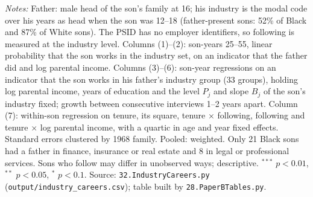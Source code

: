 \begin{table}[!htbp]
\begin{minipage}{\textwidth}\footnotesize \textit{Notes:} Father: male head of the son's family at 16; his industry is the modal code over his years as head when the son was 12--18 (father-present sons: 52\% of Black and 87\% of White sons). The PSID has no employer identifiers, so following is measured at the industry level. Columns (1)--(2): son-years 25--55, linear probability that the son works in the industry set, on an indicator that the father did and log parental income. Columns (3)--(6): son-year regressions on an indicator that the son works in his father's industry group (33 groups), holding log parental income, years of education and the level $P_j$ and slope $B_j$ of the son's industry fixed; growth between consecutive interviews 1--2 years apart. Column (7): within-son regression on tenure, its square, tenure $\times$ following, following and tenure $\times$ log parental income, with a quartic in age and year fixed effects. Standard errors clustered by 1968 family. Pooled: weighted. Only 21 Black sons had a father in finance, insurance or real estate and 8 in legal or professional services. Sons who follow may differ in unobserved ways; descriptive. $^{***}$ $p<0.01$, $^{**}$ $p<0.05$, $^{*}$ $p<0.1$. Source: \texttt{32.IndustryCareers.py} (\texttt{output/industry\_careers.csv}); table built by \texttt{28.PaperBTables.py}.\end{minipage}
\end{table}
